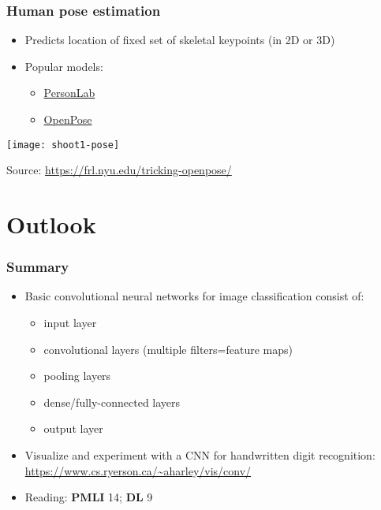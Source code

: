 \documentclass[smaller]{beamer}
\begin{document}
\begin{frame}
  \frametitle{Human pose estimation}
  \pe
  \begin{itemize}
  \item Predicts location of fixed set of skeletal keypoints (in 2D or 3D)\pe
  \item Popular models: \pe
    \begin{itemize}
    \item \href{https://link.springer.com/chapter/10.1007/978-3-030-01264-9_17}{PersonLab}\pe
    \item \href{https://arxiv.org/pdf/1812.08008.pdf}{OpenPose}
    \end{itemize}
  \end{itemize}

  \pe

    \begin{center}
    \texttt{[image: shoot1-pose]}

    {\tiny Source: \url{https://frl.nyu.edu/tricking-openpose/}}
  \end{center}
  
\end{frame}

\section{Outlook}
\begin{frame}
  \frametitle{Summary}
  \begin{itemize}
  \item Basic convolutional neural networks for image classification consist of:
    \begin{itemize}
    \item input layer
    \item convolutional layers (multiple filters=feature maps)
    \item pooling layers
    \item dense/fully-connected layers
    \item output layer
    \end{itemize}
  \item Visualize and experiment with a CNN for handwritten digit recognition: \url{https://www.cs.ryerson.ca/~aharley/vis/conv/}
    \item Reading: \textbf{PMLI} 14; \textbf{DL} 9
  \end{itemize}
\end{frame}
 
\appendix

 
\end{document}

